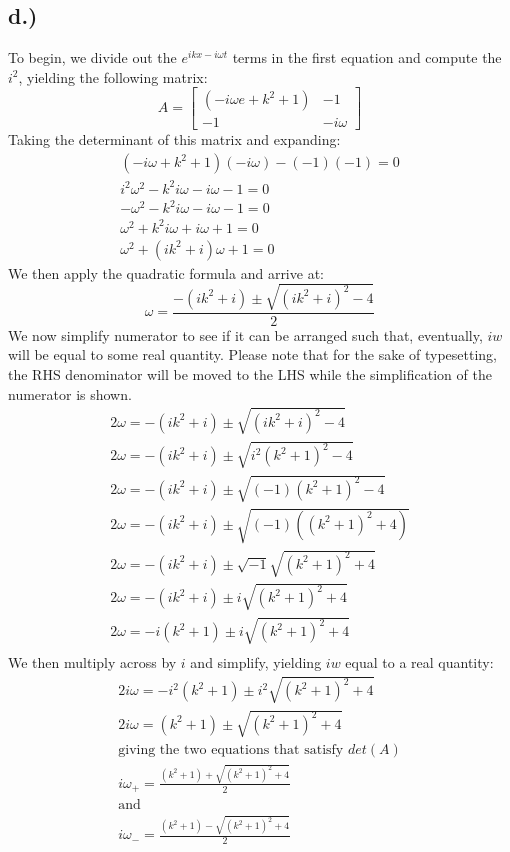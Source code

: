 \documentclass{article}
\begin{document}
\subsection*{d.)}
To begin, we divide out the $e^{ikx - i\omega t}$ terms in the first equation and compute the $i^2$, yielding the following matrix:
\[
A =
\begin{bmatrix}
(-i\omega e + k^2 + 1) & -1\\
-1 & -i\omega
\end{bmatrix}
\]
Taking the determinant of this matrix and expanding:
\begin{equation}
\begin{aligned}
(-i\omega + k^2 + 1)(-i\omega) - (-1)(-1) = 0\\
i^2\omega^2 - k^2i\omega - i\omega -1 = 0\\
-\omega^2 - k^2i\omega -i\omega -1 = 0\\
\omega^2 + k^2i\omega + i\omega + 1 = 0\\
\omega^2 + (ik^2 + i)\omega + 1 =0
\end{aligned}
\end{equation}
We then apply the quadratic formula and arrive at:
\begin{equation}
\omega = \frac{-(ik^2 + i) \pm \sqrt{(ik^2 + i)^2 -4}}{2}
\end{equation}
We now simplify numerator to see if it can be arranged such that, eventually, $iw$ will be equal to some real quantity. Please note that for the sake of typesetting, the RHS denominator will be moved to the LHS while the simplification of the numerator is shown.
\begin{equation}
\begin{aligned}
2\omega = -(ik^2 + i) \pm \sqrt{(ik^2 + i)^2 -4}\\
2\omega = -(ik^2 + i) \pm \sqrt{i^2(k^2 + 1)^2 -4}\\
2\omega = -(ik^2 + i) \pm \sqrt{(-1)(k^2 + 1)^2 -4}\\
2\omega = -(ik^2 + i) \pm \sqrt{(-1)((k^2 + 1)^2 +4)}\\
2\omega = -(ik^2 + i) \pm \sqrt{-1}\sqrt{(k^2 + 1)^2 +4}\\
2\omega = -(ik^2 + i) \pm i\sqrt{(k^2 + 1)^2 +4}\\
2\omega = -i(k^2 + 1) \pm i\sqrt{(k^2 + 1)^2 +4}\\
\end{aligned}
\end{equation}
We then multiply across by $i$ and simplify, yielding $iw$ equal to a real quantity:
\begin{equation}
\begin{aligned}
2i\omega = -i^2(k^2 + 1) \pm i^2\sqrt{(k^2 + 1)^2 +4}\\
2i\omega = (k^2 + 1) \pm \sqrt{(k^2 + 1)^2 +4}\\
\text{giving the two equations that satisfy $det(A)$}\\
i\omega_+ = \frac{(k^2 + 1) + \sqrt{(k^2 + 1)^2 +4}}{2}\\
\text{and}\\
i\omega_- = \frac{(k^2 + 1) - \sqrt{(k^2 + 1)^2 +4}}{2}\\
\end{aligned}
\end{equation}
\end{document}
